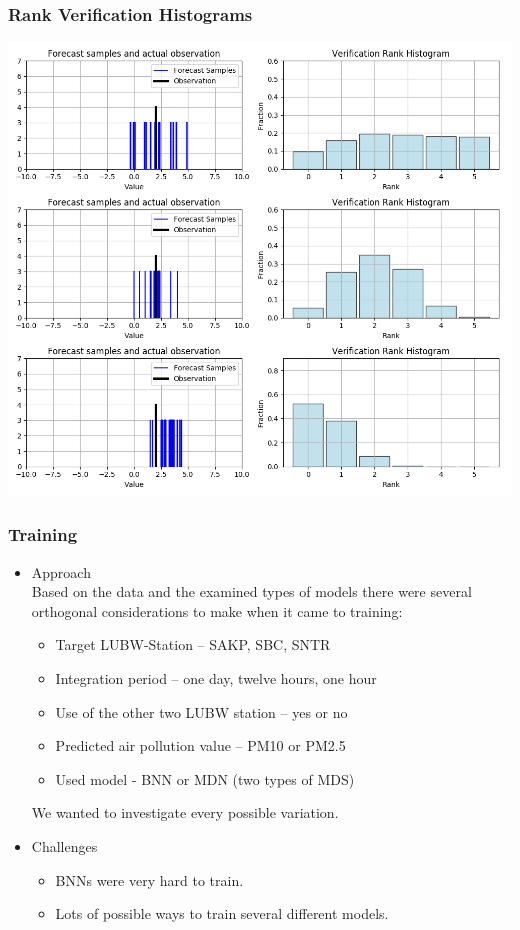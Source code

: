 \documentclass[18pt]{beamer}
\begin{document}
\begin{frame}
  \frametitle{Rank Verification Histograms}
  \begin{center}
    \includegraphics[scale=0.32]{images/verification_histogram}
  \end{center}
\end{frame}


\begin{frame}
  \frametitle{Training}
  \begin{itemize}
  \item Approach \\
    Based on the data and the examined types of models there were several orthogonal considerations to make when it came to training:
    \begin{itemize}
    \item Target LUBW-Station -- SAKP, SBC, SNTR
    \item Integration period -- one day, twelve hours, one hour
    \item Use of the other two LUBW station -- yes or no
    \item Predicted air pollution value -- PM10 or PM2.5
    \item Used model - BNN or MDN (two types of MDS)
    \end{itemize}
    We wanted to investigate every possible variation.
  \item Challenges
    \begin{itemize}
    \item BNNs were very hard to train.
    \item Lots of possible ways to train several different models.
    \end{itemize}
  \end{itemize}
\end{frame}
\end{document}

